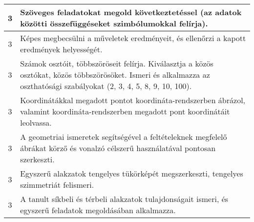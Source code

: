 \begin{longtable}{c | p{} }
                                
                                          3 &  Szöveges feladatokat megold következtetéssel (az adatok közötti összefüggéseket szimbólumokkal felírja). \\ \hline
                                          3 &  Képes megbecsülni a műveletek eredményeit, és ellenőrzi a kapott eredmények helyességét. \\ \hline
                                          3 &  Számok osztóit, többszöröseit felírja. Kiválasztja a közös osztókat, közös többszörösöket. Ismeri és alkalmazza az oszthatósági szabályokat (2, 3, 4, 5, 8, 9, 10, 100). \\ \hline
                                          3 &  Koordinátákkal megadott pontot koordináta-rendszerben ábrázol, valamint koordináta-rendszerben megadott pont koordinátáit leolvassa. \\ \hline
                                          3 &  A geometriai ismeretek segítségével a feltételeknek megfelelő ábrákat körző és vonalzó célszerű használatával pontosan szerkeszti. \\ \hline
                                          3 &  Egyszerű alakzatok tengelyes tükörképét megszerkeszti, tengelyes szimmetriát felismeri. \\ \hline
                                          3 &  A tanult síkbeli és térbeli alakzatok tulajdonságait ismeri, és egyszerű feladatok megoldásában alkalmazza. \\ \hline
                                      

\end{longtable}
